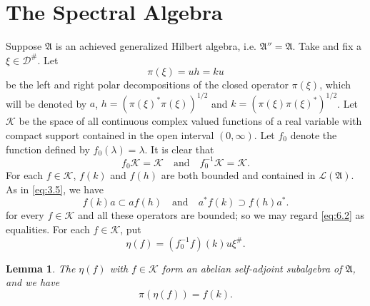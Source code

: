 \documentclass[12pt,b5paper,twoside]{article}
\theoremstyle{takesaki}
\newtheorem{lemma}{Lemma}[section]
\numberwithin{equation}{section}
\begin{document}
\section{The Spectral Algebra}
\label{sec:6}

Suppose $\mathfrak A$ is an achieved generalized Hilbert algebra, i.e.
$\mathfrak A''=\mathfrak A$.  Take and fix a
$\xi\in\mathcal D^\#$.  Let
\begin{equation}
 \pi(\xi)=uh=ku
 \tag{6.1}\label{eq:6.1}
\end{equation}
be the left and right polar decompositions of the closed operator
$\pi(\xi)$, which will be denoted by $a$,
$h=(\pi(\xi)^*\pi(\xi))^{1/2}$ and
$k=(\pi(\xi)\pi(\xi)^*)^{1/2}$.  Let $\mathcal K$ be the space of all
continuous complex valued functions of a real variable with compact
support contained in the open interval $(0,\infty)$.  Let $f_0$ denote
the function defined by $f_0(\lambda)=\lambda$.  It is clear that
\[
 f_0\mathcal K=\mathcal K
 \quad\text{and}\quad
 f_0^{-1}\mathcal K=\mathcal K.
\]
For each $f\in\mathcal K$, $f(k)$ and $f(h)$ are both bounded and
contained in $\mathcal L(\mathfrak A)$.  As in \eqref{eq:3.5}, we have
\begin{equation}
 f(k)a\subset af(h)
 \quad\text{and}\quad
 a^*f(k)\supset f(h)a^*.
 \tag{6.2}\label{eq:6.2}
\end{equation}
for every $f\in\mathcal K$ and all these operators are bounded; so we
may regard \eqref{eq:6.2} as equalities.  For each $f\in\mathcal K$,
put
\begin{equation}
 \eta(f)=(f_0^{-1}f)(k)u\xi^\#.
 \tag{6.3}\label{eq:6.3}
\end{equation}

\begin{lemma}\label{lem:6.1}
The $\eta(f)$ with $f\in\mathcal K$ form an abelian self-adjoint
subalgebra of $\mathfrak A$, and we have
\begin{equation}
 \pi(\eta(f))=f(k).
 \tag{6.4}\label{eq:6.4}
\end{equation}
\end{lemma}
\end{document}
